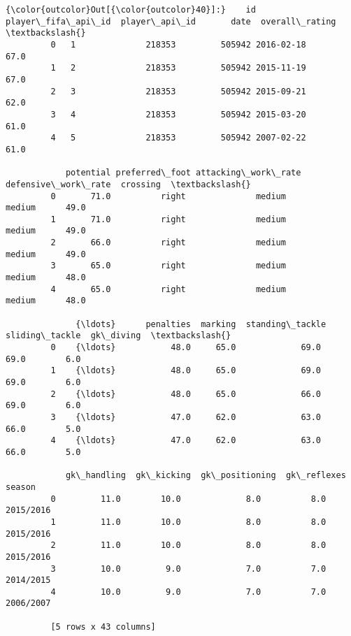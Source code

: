 \documentclass[11pt]{article}
\begin{document}
\begin{Verbatim}[commandchars=\\\{\}]
{\color{outcolor}Out[{\color{outcolor}40}]:}    id  player\_fifa\_api\_id  player\_api\_id       date  overall\_rating  \textbackslash{}
         0   1              218353         505942 2016-02-18            67.0   
         1   2              218353         505942 2015-11-19            67.0   
         2   3              218353         505942 2015-09-21            62.0   
         3   4              218353         505942 2015-03-20            61.0   
         4   5              218353         505942 2007-02-22            61.0   
         
            potential preferred\_foot attacking\_work\_rate defensive\_work\_rate  crossing  \textbackslash{}
         0       71.0          right              medium              medium      49.0   
         1       71.0          right              medium              medium      49.0   
         2       66.0          right              medium              medium      49.0   
         3       65.0          right              medium              medium      48.0   
         4       65.0          right              medium              medium      48.0   
         
              {\ldots}      penalties  marking  standing\_tackle  sliding\_tackle  gk\_diving  \textbackslash{}
         0    {\ldots}           48.0     65.0             69.0            69.0        6.0   
         1    {\ldots}           48.0     65.0             69.0            69.0        6.0   
         2    {\ldots}           48.0     65.0             66.0            69.0        6.0   
         3    {\ldots}           47.0     62.0             63.0            66.0        5.0   
         4    {\ldots}           47.0     62.0             63.0            66.0        5.0   
         
            gk\_handling  gk\_kicking  gk\_positioning  gk\_reflexes     season  
         0         11.0        10.0             8.0          8.0  2015/2016  
         1         11.0        10.0             8.0          8.0  2015/2016  
         2         11.0        10.0             8.0          8.0  2015/2016  
         3         10.0         9.0             7.0          7.0  2014/2015  
         4         10.0         9.0             7.0          7.0  2006/2007  
         
         [5 rows x 43 columns]
\end{Verbatim}
            
\end{document}
